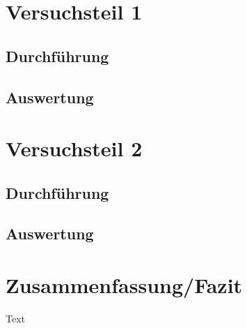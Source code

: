 \documentclass[11pt]{scrartcl}
\begin{document}


\section{Versuchsteil 1}


\subsection{Durchführung}


\subsection{Auswertung}


\section{Versuchsteil 2}



\subsection{Durchführung}



\subsection{Auswertung}




\section{Zusammenfassung/Fazit}

Text
\end{document}
